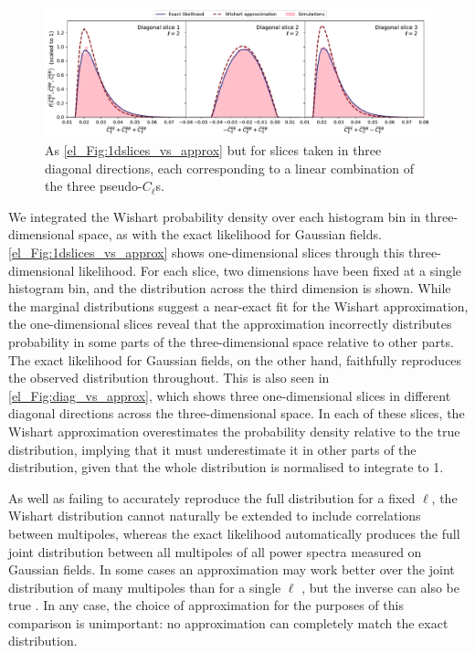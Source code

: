 \begin{figure}
    \includegraphics[width=\columnwidth]{diag_vs_approx}
    \caption{As \autoref{el_Fig:1dslices_vs_approx} but for slices taken in three diagonal directions, each corresponding to a linear combination of the three pseudo-$C_\ell$s.}
    \label{el_Fig:diag_vs_approx}
\end{figure}

We integrated the Wishart probability density over each histogram bin in three-dimensional space, as with the exact likelihood for Gaussian fields. \autoref{el_Fig:1dslices_vs_approx} shows one-dimensional slices through this three-dimensional likelihood. For each slice, two dimensions have been fixed at a single histogram bin, and the distribution across the third dimension is shown. While the marginal distributions suggest a near-exact fit for the Wishart approximation, the one-dimensional slices reveal that the approximation incorrectly distributes probability in some parts of the three-dimensional space relative to other parts. The exact likelihood for Gaussian fields, on the other hand, faithfully reproduces the observed distribution throughout. This is also seen in \autoref{el_Fig:diag_vs_approx}, which shows three one-dimensional slices in different diagonal directions across the three-dimensional space. In each of these slices, the Wishart approximation overestimates the probability density relative to the true distribution, implying that it must underestimate it in other parts of the distribution, given that the whole distribution is normalised to integrate to 1.

As well as failing to accurately reproduce the full distribution for a fixed $\ell$, the Wishart distribution cannot naturally be extended to include correlations between multipoles, whereas the exact likelihood automatically produces the full joint distribution between all multipoles of all power spectra measured on Gaussian fields. In some cases an approximation may work better over the joint distribution of many multipoles than for a single $\ell$ \citep{Hamimeche2008}, but the inverse can also be true \citep{Elsner2012}. In any case, the choice of approximation for the purposes of this comparison is unimportant: no approximation can completely match the exact distribution.


